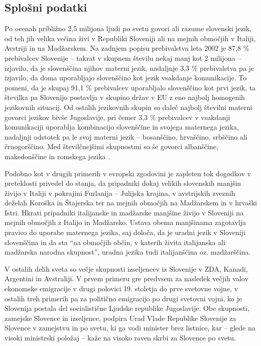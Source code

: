 \begin{multicols}{2}

\subsection{Splošni podatki}

Po ocenah približno 2,5 milijona ljudi po svetu govo\-ri ali razume slovenski jezik, od teh jih velika večina živi v Republiki Sloveniji ali na mejnih območjih v Italiji, Avstriji in na Madžarskem. Na zadnjem popisu prebivalstva leta 2002 je 87,8 \% prebivalcev Slovenije – takrat v skupnem številu nekaj manj kot 2 milijona – izjavilo, da je slovenščina njihov materni jezik, nadaljnje 3,3 \% prebivalstva pa je izjavilo, da doma uporabljajo slovenščino kot jezik vsakdanje komunikacije. To pomeni, da je skupaj 91,1 \% prebivalcev uporabljalo slovenščino kot prvi jezik, ta številka pa Slovenijo postavlja v skupino držav v EU z eno najbolj homogenih jezikovnih situacij. Od ostalih jezikovnih skupin so daleč najbolj številni materni govorci jezikov bivše Jugoslavije, pri čemer 3,3 \% prebivalcev v vsakdanji komunikaciji uporablja kombinacijo slovenščine in svojega maternega jezika, nadaljnji odstotek pa le svoj materni jezik – bosanščino, hrvaščino, srbščino ali črnogorščino. Med številčnejšimi skupnostmi so še govorci albanščine, makedonščine in romskega jezika \cite{SURS1}.

Podobno kot v drugih primerih v evropski zgodovini je zapleten tok dogodkov v preteklosti privedel do stanja, da pripadniki dokaj velikih slovenskih manj\-šin živijo v Italiji v pokrajini Furlanija -- Julijska krajina, v avstrijskih zveznih deželah Koroška in Štajerska ter na mejnih območjih na Madžarskem in v hrvaški Istri. Hkrati pripadniki italijanske in madžarske manjšine živijo v Sloveniji na mejnih območjih z Italijo in Madžarsko. Ustava obema manjšinama zagotavlja pravico do uporabe maternega jezika, saj določa, da je uradni jezik v Sloveniji slovenščina in da sta “na območjih občin, v katerih živita italijanska ali madžarska narodna skupnost”, uradna jezika tudi italijanščina oz. madžarščina.

V ostalih delih sveta so večje skupnosti izseljencev iz Slovenije v ZDA, Kanadi, Argentini in Avstra\-liji. V prvem primeru gre predvsem za nasledek večjih valov ekonomske emigracije v drugi polovici 19. stoletja do prve svetovne vojne, v ostalih treh primerih pa za politično emigracijo po drugi svetovni vojni, ko je Slovenija postala del socialistične Ljudske republike Jugoslavije. Obe skupnosti, zamejske Slovence in izseljence, podpira Urad Vlade Republike Slovenije za Slovence v zamejstvu in po svetu, ki ga vodi minister brez listnice, kar – glede na visoki ministrski položaj – kaže na visoko raven skrbi za Slovence po svetu.


\end{multicols}
